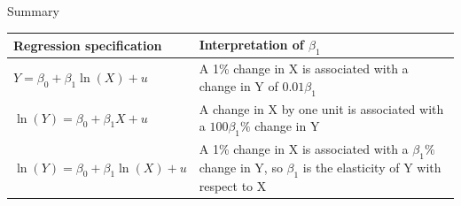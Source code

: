 \documentclass[presentation,10pt]{beamer}
\begin{document}
\begin{frame}[label={sec:orgcb0cfe5}]{Summary}
\begin{center}
\begin{tabular}{p{4cm}p{6cm}}
Regression specification & Interpretation of \(\beta_1\)\\
\hline
\(Y = \beta_0 + \beta_1 \ln(X) + u\) & A 1\% change in X is associated with a change in Y of \(0.01\beta_{1}\)\\
\hline
\(\ln(Y) = \beta_0 + \beta_1 X + u\) & A change in X by one unit is associated with a \(100\beta_1\%\) change in Y\\
\hline
\(\ln(Y) = \beta_0 + \beta_1 \ln(X) + u\) & A 1\% change in X is associated with a \(\beta_{1}\%\) change in Y, so \(\beta_1\) is the elasticity of Y with respect to X\\
\end{tabular}
\end{center}
\end{frame}
\end{document}
